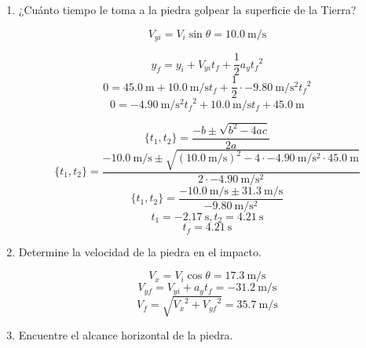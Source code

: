 \documentclass[../practica.root.tex]{subfiles}
\begin{document}
\begin{enumerate}
        \begin{center}
        \end{center}

        \begin{enumerate}
          \item ¿Cuánto tiempo le toma a la piedra golpear la superficie de la Tierra?

                \[V_{yi}=V_i\sin{\theta}=\SI{10,0}{\meter\per\second}\]

                \[y_f=y_i+V_{yi}t_f+\frac{1}{2}a_y{t_f}^2\]
                \[0=\SI{45,0}{\meter}+\SI{10,0}{\meter\per\second}t_f+\frac{1}{2}\cdot\SI{-9,80}{\meter\per\second\squared}{t_f}^2\]
                \[0=\SI{-4,90}{\meter\per\second\squared}{t_f}^2+\SI{10,0}{\meter\per\second}t_f+\SI{45,0}{\meter}\]

                \[\{t_1,t_2\}=\frac{-b\pm\sqrt{b^2-4ac}}{2a}\]
                \[\{t_1,t_2\}=\frac{\SI{-10,0}{\meter\per\second}\pm\sqrt{(\SI{10,0}{\meter\per\second})^2-4\cdot\SI{-4,90}{\meter\per\second\squared}\cdot\SI{45,0}{\meter}}}{2\cdot\SI{-4,90}{\meter\per\second\squared}}\]
                \[\{t_1,t_2\}=\frac{\SI{-10,0}{\meter\per\second}\pm\SI{31,3}{\meter\per\second}}{\SI{-9,80}{\meter\per\second\squared}}\]
                \[t_1=\SI{-2,17}{\second}, t_2=\SI{4,21}{\second}\]
                \[t_f=\boxed{\SI{4,21}{\second}}\]

          \item Determine la velocidad de la piedra en el impacto.

                \[V_x=V_i\cos{\theta}=\SI{17,3}{\meter\per\second}\]
                \[V_{yf}=V_{yi}+a_yt_f=\SI{-31,2}{\meter\per\second}\]
                \[V_f=\sqrt{{V_x}^2+{V_{yf}}^2}=\boxed{\SI{35,7}{\meter\per\second}}\]

          \item Encuentre el alcance horizontal de la piedra.


\end{enumerate}
\end{enumerate}
\end{document}
